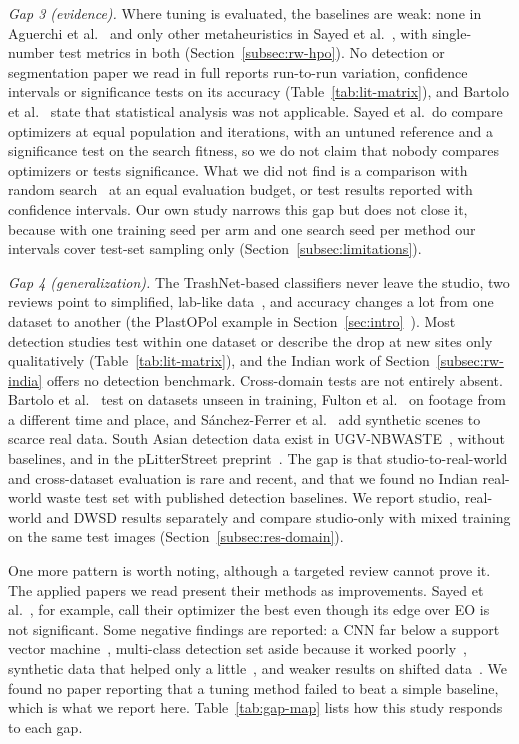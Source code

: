 \textit{Gap 3 (evidence).} Where tuning is evaluated, the baselines are weak: none in Aguerchi et al.~\cite{aguerchi2024cnn} and only other metaheuristics in Sayed et al.~\cite{sayed2024intelligent}, with single-number test metrics in both (Section~\ref{subsec:rw-hpo}). No detection or segmentation paper we read in full reports run-to-run variation, confidence intervals or significance tests on its accuracy (Table~\ref{tab:lit-matrix}), and Bartolo et al.~\cite{bartolo2025learning} state that statistical analysis was not applicable. Sayed et al.\ do compare optimizers at equal population and iterations, with an untuned reference and a significance test on the search fitness, so we do not claim that nobody compares optimizers or tests significance. What we did not find is a comparison with random search~\cite{bergstra2012random} at an equal evaluation budget, or test results reported with confidence intervals. Our own study narrows this gap but does not close it, because with one training seed per arm and one search seed per method our intervals cover test-set sampling only (Section~\ref{subsec:limitations}).

\textit{Gap 4 (generalization).} The TrashNet-based classifiers never leave the studio, two reviews point to simplified, lab-like data~\cite{lu2022computer,fang2023artificial}, and accuracy changes a lot from one dataset to another (the PlastOPol example in Section~\ref{sec:intro}~\cite{cordova2022litter}). Most detection studies test within one dataset or describe the drop at new sites only qualitatively (Table~\ref{tab:lit-matrix}), and the Indian work of Section~\ref{subsec:rw-india} offers no detection benchmark. Cross-domain tests are not entirely absent. Bartolo et al.~\cite{bartolo2025learning} test on datasets unseen in training, Fulton et al.~\cite{fulton2019robotic} on footage from a different time and place, and S\'{a}nchez-Ferrer et al.~\cite{sanchezferrer2023experimental} add synthetic scenes to scarce real data. South Asian detection data exist in UGV-NBWASTE~\cite{isalm2025ugvnbwaste}, without baselines, and in the pLitterStreet preprint~\cite{mandhati2024plitterstreet}. The gap is that studio-to-real-world and cross-dataset evaluation is rare and recent, and that we found no Indian real-world waste test set with published detection baselines. We report studio, real-world and DWSD results separately and compare studio-only with mixed training on the same test images (Section~\ref{subsec:res-domain}).

One more pattern is worth noting, although a targeted review cannot prove it. The applied papers we read present their methods as improvements. Sayed et al.~\cite{sayed2024intelligent}, for example, call their optimizer the best even though its edge over EO is not significant. Some negative findings are reported: a CNN far below a support vector machine~\cite{yang2016classification}, multi-class detection set aside because it worked poorly~\cite{majchrowska2022deep}, synthetic data that helped only a little~\cite{sanchezferrer2023experimental}, and weaker results on shifted data~\cite{fulton2019robotic,liao2022realtime}. We found no paper reporting that a tuning method failed to beat a simple baseline, which is what we report here. Table~\ref{tab:gap-map} lists how this study responds to each gap.

